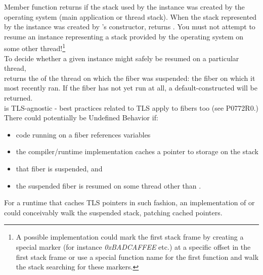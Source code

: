 
Member function \usessysstack returns  if the stack used by the
\fiber instance was created by the operating system (main application or thread
stack). When the stack represented by the \fiber instance was created
by \fiber's constructor, \usessysstack returns . You must not
attempt to resume an instance representing a stack
provided by the operating system on some other thread!\footnote{A possible
implementation could mark the first stack frame by creating
a special marker (for instance \emph{0xBADCAFFEE} etc.) at a specific offset
in the first stack frame or use a special function name for the first function 
and walk the stack searching for these markers.}\\

To decide whether a given \fiber instance might safely be resumed on a
particular thread,\\\prevtid returns the  of the thread on
which the fiber was suspended: the fiber on which it most recently ran. If the
fiber has not yet run at all, a default-constructed  will
be returned.\\

\fiber is TLS-agnostic - best practices related to TLS apply to fibers too
(see P0772R0.)\\

There could potentially be Undefined Behavior if:
\begin{itemize}
    \item code running on a fiber references  variables
    \item the compiler/runtime implementation caches a pointer
          to  storage on the stack
    \item that fiber is suspended, and
    \item the suspended fiber is resumed on some thread other than \prevtid.
\end{itemize}

For a runtime that caches TLS pointers in such fashion, an implementation
of \xtresume or\\
\xtresumewith could conceivably walk the suspended stack,
patching cached pointers.
